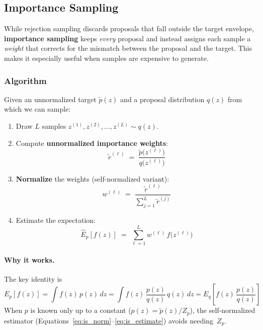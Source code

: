 \documentclass[12pt, a4paper]{article}
\begin{document}
\subsection{Importance Sampling}
\label{sec:importance}

While rejection sampling discards proposals that fall outside the
target envelope, \textbf{importance sampling} keeps \emph{every}
proposal and instead assigns each sample a \emph{weight} that
corrects for the mismatch between the proposal and the target.
This makes it especially useful when samples are expensive to
generate.

\subsubsection{Algorithm}

Given an unnormalized target $\tilde{p}(z)$ and a proposal
distribution $q(z)$ from which we can sample:

\begin{enumerate}
    \item Draw $L$ samples
          $z^{(1)}, z^{(2)}, \ldots, z^{(L)} \sim q(z)$.
    \item Compute \textbf{unnormalized importance weights}:
          \begin{equation}
              \tilde{r}^{(\ell)} \;=\;
              \frac{\tilde{p}\bigl(z^{(\ell)}\bigr)}
                   {q\bigl(z^{(\ell)}\bigr)}
              \label{eq:is_unnorm}
          \end{equation}
    \item \textbf{Normalize} the weights (self-normalized variant):
          \begin{equation}
              w^{(\ell)} \;=\;
              \frac{\tilde{r}^{(\ell)}}
                   {\sum_{j=1}^{L} \tilde{r}^{(j)}}
              \label{eq:is_norm}
          \end{equation}
    \item Estimate the expectation:
          \begin{equation}
              \hat{E}_p[f(z)] \;=\;
              \sum_{\ell=1}^{L} w^{(\ell)}\, f\bigl(z^{(\ell)}\bigr)
              \label{eq:is_estimate}
          \end{equation}
\end{enumerate}

\paragraph{Why it works.}
The key identity is
\begin{equation}
    E_p[f(z)]
    = \int f(z)\,p(z)\,dz
    = \int f(z)\,\frac{p(z)}{q(z)}\,q(z)\,dz
    = E_q\!\left[f(z)\,\frac{p(z)}{q(z)}\right]
    \label{eq:is_identity}
\end{equation}
When $p$ is known only up to a constant
($p(z) = \tilde{p}(z)/Z_p$), the self-normalized estimator
(Equations~\ref{eq:is_norm}--\ref{eq:is_estimate}) avoids
needing~$Z_p$.
\end{document}
